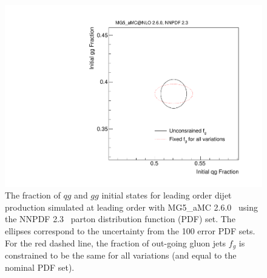 \begin{figure}[h!]
\begin{center}
\includegraphics[width = 0.5\columnwidth]{figures/PDFs.pdf}
\end{center}
\caption{The fraction of $qg$ and $gg$ initial states for leading order dijet production simulated at leading order with MG5\_aMC 2.6.0~\cite{Alwall:2014hca} using the NNPDF 2.3~\cite{Ball:2012cx} parton distribution function (PDF) set.  The ellipses correspond to the uncertainty from the 100 error PDF sets.  For the red dashed line, the fraction of out-going gluon jets $f_g$ is constrained to be the same for all variations (and equal to the nominal PDF set).}
\label{fig:pdf}
\end{figure}





























